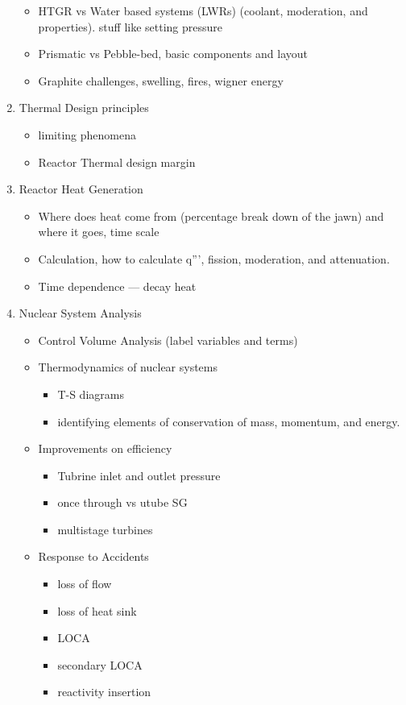 \documentclass{article}
\begin{document}
\begin{enumerate}
\begin{itemize}
        \item HTGR vs Water based systems (LWRs) (coolant, moderation, and properties). stuff like setting pressure
        \item Prismatic vs Pebble-bed, basic components and layout
        \item Graphite challenges, swelling, fires, wigner energy
    \end{itemize}
    \item Thermal Design principles
    \begin{itemize}
        \item limiting phenomena 
        \item Reactor Thermal design margin
    \end{itemize}
    \item Reactor Heat Generation
    \begin{itemize}
        \item Where does heat come from (percentage break down of the jawn) and where it goes, time scale
        \item Calculation, how to calculate q''', fission, moderation, and attenuation.
        \item Time dependence --- decay heat
    \end{itemize}
    \item Nuclear System Analysis
    \begin{itemize}
        \item Control Volume Analysis (label variables and terms)
        \item Thermodynamics of nuclear systems 
        \begin{itemize}
            \item T-S diagrams
            \item identifying elements of conservation of mass, momentum, and energy.
        \end{itemize}
        \item Improvements on efficiency
        \begin{itemize}
            \item Tubrine inlet and outlet pressure
            \item once through vs utube SG
            \item multistage turbines
        \end{itemize}
        \item Response to Accidents
        \begin{itemize}
            \item loss of flow
            \item loss of heat sink 
            \item LOCA
            \item secondary LOCA
            \item reactivity insertion
        \end{itemize}
    \end{itemize} 
\end{enumerate}
\end{document}
